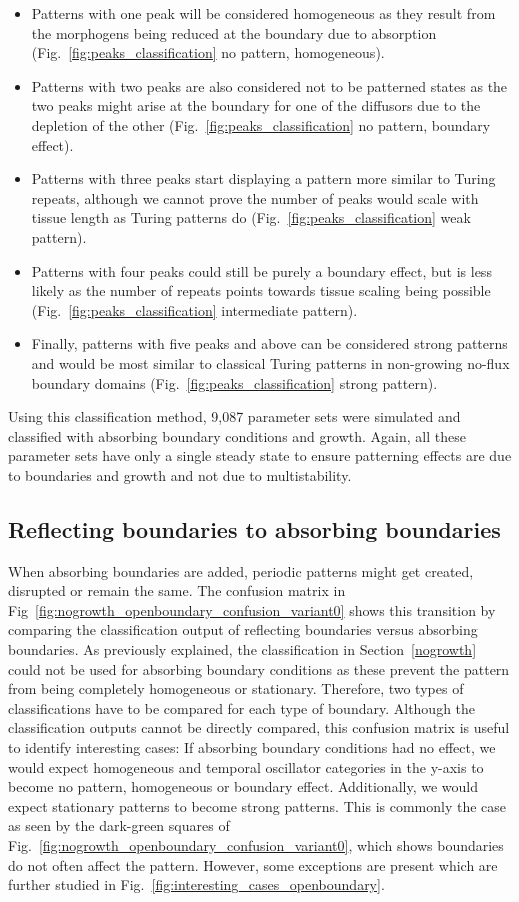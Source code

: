 \begin{itemize}
    \item Patterns with one peak will be considered homogeneous as they result from the morphogens being reduced at the boundary due to absorption (Fig.~\ref{fig:peaks_classification} no pattern, homogeneous).
    \item Patterns with two peaks are also considered not to be patterned states as the two peaks might arise at the boundary for one of the diffusors due to the depletion of the other (Fig.~\ref{fig:peaks_classification} no pattern, boundary effect).
    \item Patterns with three peaks start displaying a pattern more similar to Turing repeats, although we cannot prove the number of peaks would scale with tissue length as Turing patterns do (Fig.~\ref{fig:peaks_classification} weak pattern).
    \item Patterns with four peaks could still be purely a boundary effect, but is less likely as the number of repeats points towards tissue scaling being possible (Fig.~\ref{fig:peaks_classification} intermediate pattern).
    \item Finally, patterns with five peaks and above can be considered strong patterns and would be most similar to classical Turing patterns in non-growing no-flux boundary domains (Fig.~\ref{fig:peaks_classification} strong pattern).
\end{itemize}
Using this classification method, 9,087 parameter sets were simulated and classified with absorbing boundary conditions and growth.
Again, all these parameter sets have only a single steady state to ensure patterning effects are due to boundaries and growth and not due to multistability.


\subsection{Reflecting boundaries to absorbing boundaries}
When absorbing boundaries are added, periodic patterns might get created, disrupted or remain the same.
The confusion matrix in Fig~\ref{fig:nogrowth_openboundary_confusion_variant0} shows this transition by comparing the classification output of reflecting boundaries versus absorbing boundaries.
As previously explained, the classification in Section~\ref{nogrowth} could not be used for absorbing boundary conditions as these prevent the pattern from being completely homogeneous or stationary.
Therefore, two types of classifications have to be compared for each type of boundary.
Although the classification outputs cannot be directly compared, this confusion matrix is useful to identify interesting cases:
If absorbing boundary conditions had no effect, we would expect homogeneous and temporal oscillator categories in the y-axis to become no pattern, homogeneous or boundary effect.
Additionally, we would expect stationary patterns to become strong patterns.
This is commonly the case as seen by the dark-green squares of Fig.~\ref{fig:nogrowth_openboundary_confusion_variant0}, which shows boundaries do not often affect the pattern.
However, some exceptions are present which are further studied in Fig.~\ref{fig:interesting_cases_openboundary}.

